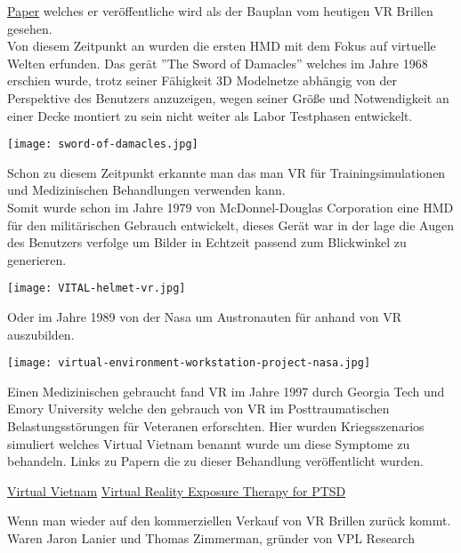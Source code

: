 \href{http://worrydream.com/refs/Sutherland%20-%20The%20Ultimate%20Display.pdf}{Paper} welches er veröffentliche wird als der Bauplan 
vom heutigen VR Brillen gesehen.\cite{virtualrealityhistory}\\
Von diesem Zeitpunkt an wurden die ersten HMD mit dem Fokus auf virtuelle Welten erfunden. Das gerät ''The Sword
of Damacles'' welches im Jahre 1968 erschien wurde, trotz seiner Fähigkeit 3D Modelnetze abhängig von der Perspektive des Benutzers
anzuzeigen, wegen seiner Größe und Notwendigkeit an einer Decke montiert zu sein nicht weiter als Labor Testphasen
entwickelt.\cite{virtualrealityhistory} \\
\begin{center}
    \texttt{[image: sword-of-damacles.jpg]}\cite{swordofdamacles}
\end{center}
Schon zu diesem Zeitpunkt erkannte man das man VR für Trainingsimulationen und Medizinischen Behandlungen verwenden kann. \\ 
Somit wurde schon im Jahre 1979 von McDonnel-Douglas Corporation eine HMD für den militärischen Gebrauch entwickelt, dieses Gerät war in der
lage die Augen des Benutzers verfolge um Bilder in Echtzeit passend zum Blickwinkel zu generieren.\cite{virtualrealityhistory}
\begin{center}
    \texttt{[image: VITAL-helmet-vr.jpg]}\cite{vitalhelmet}
\end{center}
\newpage \noindent
Oder im Jahre 1989 von der Nasa um Austronauten für anhand von VR auszubilden.  
\begin{center}
    \texttt{[image: virtual-environment-workstation-project-nasa.jpg]}\cite{nasahelmet}
\end{center}
Einen Medizinischen gebraucht fand VR im Jahre 1997 durch Georgia Tech und Emory University welche den gebrauch von VR im Posttraumatischen
Belastungsstörungen für Veteranen erforschten. Hier wurden Kriegsszenarios simuliert welches Virtual Vietnam benannt wurde um diese Symptome
zu behandeln. Links zu Papern die zu dieser Behandlung veröffentlicht wurden.\cite{virtualrealityhistory}
\begin{center}
    \href{http://gotz.web.unc.edu/files/2013/10/icat.pdf}{Virtual Vietnam}
    \href{http://gotz.web.unc.edu/files/2013/10/jts1999.pdf}{Virtual Reality Exposure Therapy for PTSD}
\end{center}
Wenn man wieder auf den kommerziellen Verkauf von VR Brillen zurück kommt. Waren Jaron Lanier und Thomas Zimmerman, gründer von VPL Research
